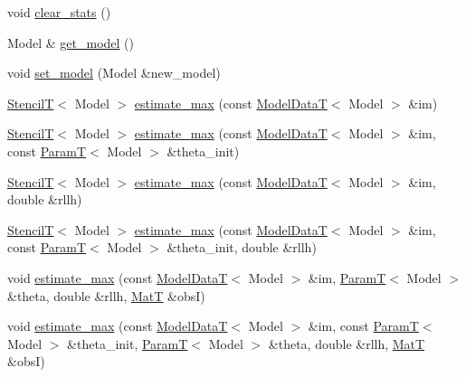 \begin{DoxyCompactItemize}
\item 
void \hyperlink{classmappel_1_1ThreadedEstimator_a8acce3a5a89128403c97b53bc3698d61}{clear\+\_\+stats} ()
\item 
Model \& \hyperlink{classmappel_1_1Estimator_a6c0b757d89033d70bdf03ad1fe6b03da}{get\+\_\+model} ()
\item 
void \hyperlink{classmappel_1_1Estimator_aacade4f66038545ad196edf7e8596187}{set\+\_\+model} (Model \&new\+\_\+model)
\item 
\hyperlink{namespacemappel_a3a06598240007876f8c4bf834ad86197}{StencilT}$<$ Model $>$ \hyperlink{classmappel_1_1Estimator_a4406c994d5b6239e75628ea5d479bfa2}{estimate\+\_\+max} (const \hyperlink{namespacemappel_a97f050df953605381ae9c901c3b125f1}{Model\+DataT}$<$ Model $>$ \&im)
\item 
\hyperlink{namespacemappel_a3a06598240007876f8c4bf834ad86197}{StencilT}$<$ Model $>$ \hyperlink{classmappel_1_1Estimator_aa8aa62047bfc28b1df3a9261da4f38a1}{estimate\+\_\+max} (const \hyperlink{namespacemappel_a97f050df953605381ae9c901c3b125f1}{Model\+DataT}$<$ Model $>$ \&im, const \hyperlink{namespacemappel_a667925cb0d6c0e49f2f035cc5a9a6857}{ParamT}$<$ Model $>$ \&theta\+\_\+init)
\item 
\hyperlink{namespacemappel_a3a06598240007876f8c4bf834ad86197}{StencilT}$<$ Model $>$ \hyperlink{classmappel_1_1Estimator_ab1be1fb34a71f9a46700c9d455fd5daf}{estimate\+\_\+max} (const \hyperlink{namespacemappel_a97f050df953605381ae9c901c3b125f1}{Model\+DataT}$<$ Model $>$ \&im, double \&rllh)
\item 
\hyperlink{namespacemappel_a3a06598240007876f8c4bf834ad86197}{StencilT}$<$ Model $>$ \hyperlink{classmappel_1_1Estimator_a2544f56248cb0f0763c964ddfaad32cc}{estimate\+\_\+max} (const \hyperlink{namespacemappel_a97f050df953605381ae9c901c3b125f1}{Model\+DataT}$<$ Model $>$ \&im, const \hyperlink{namespacemappel_a667925cb0d6c0e49f2f035cc5a9a6857}{ParamT}$<$ Model $>$ \&theta\+\_\+init, double \&rllh)
\item 
void \hyperlink{classmappel_1_1Estimator_a79f2d1c46789fed681985bb670e5ca37}{estimate\+\_\+max} (const \hyperlink{namespacemappel_a97f050df953605381ae9c901c3b125f1}{Model\+DataT}$<$ Model $>$ \&im, \hyperlink{namespacemappel_a667925cb0d6c0e49f2f035cc5a9a6857}{ParamT}$<$ Model $>$ \&theta, double \&rllh, \hyperlink{namespacemappel_a7091ab87c528041f7e2027195fad8915}{MatT} \&obsI)
\item 
void \hyperlink{classmappel_1_1Estimator_a8f85cf26c72c34d0071ccd2f8bb56abd}{estimate\+\_\+max} (const \hyperlink{namespacemappel_a97f050df953605381ae9c901c3b125f1}{Model\+DataT}$<$ Model $>$ \&im, const \hyperlink{namespacemappel_a667925cb0d6c0e49f2f035cc5a9a6857}{ParamT}$<$ Model $>$ \&theta\+\_\+init, \hyperlink{namespacemappel_a667925cb0d6c0e49f2f035cc5a9a6857}{ParamT}$<$ Model $>$ \&theta, double \&rllh, \hyperlink{namespacemappel_a7091ab87c528041f7e2027195fad8915}{MatT} \&obsI)

\end{DoxyCompactItemize}

